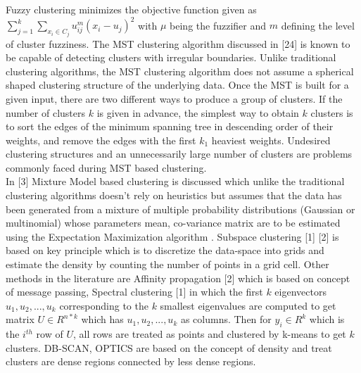 \documentclass[conference]{IEEEtran}
\begin{document}
Fuzzy clustering minimizes the objective function given as
$\sum_{j=1}^{k}\sum_{x_i \in C_j} u_{ij}^m (x_i - u_j)^2 $
 with $\mu$ being the fuzzifier and
$m$ defining the level of cluster fuzziness. The MST clustering
algorithm discussed in [24] is known to be capable of
detecting clusters with irregular boundaries. Unlike traditional
clustering algorithms, the MST clustering algorithm does
not assume a spherical shaped clustering structure of the
underlying data. Once the MST is built for a given input, there
are two different ways to produce a group of clusters. If the
number of clusters $k$ is given in advance, the simplest way to
obtain $k$ clusters is to sort the edges of the minimum spanning
tree in descending order of their weights, and remove the
edges with the first $k_1$ heaviest weights. Undesired clustering
structures and an unnecessarily large number of clusters are
problems commonly faced during MST based clustering. \\


In [3] Mixture Model based clustering is discussed which
unlike the traditional clustering algorithms doesn't rely on
heuristics but assumes that the data has been generated from
a mixture of multiple probability distributions (Gaussian or
multinomial) whose parameters mean, co-variance matrix are
to be estimated using the Expectation Maximization algorithm
. Subspace clustering [1] [2] is based on key principle which
is to discretize the data-space into grids and estimate the
density by counting the number of points in a grid cell. Other
methods in the literature are Affinity propagation [2] which is based on concept of message passing, Spectral clustering [1]
in which the ﬁrst $k$ eigenvectors $u_1,u_2,...,u_k$ corresponding to the $k$ smallest eigenvalues are computed to get matrix $U \in R^{n*k}$ which has $u_1,u_2,...,u_k$ as columns. Then for $y_i \in R^k$ which is the $i^{th}$ row of $U$, all rows are treated as points and clustered by k-means to get $k$ clusters. DB-SCAN,
OPTICS are based on the concept of density and treat clusters
are dense regions connected by less dense regions.\\
\end{document}
